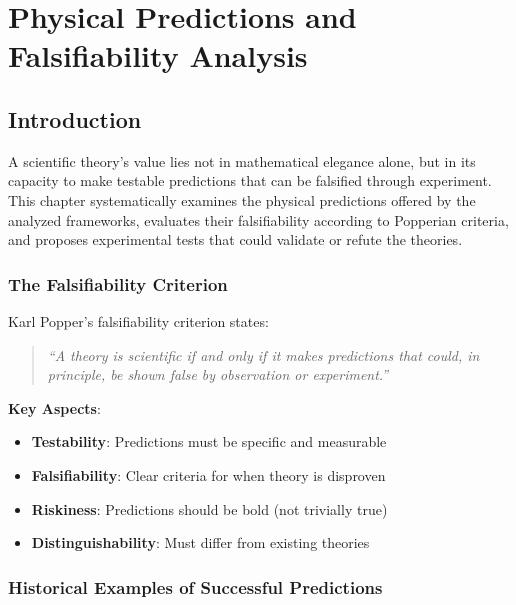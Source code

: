 
\chapter{Physical Predictions and Falsifiability Analysis}
\label{ch:predictions}

\section{Introduction}

A scientific theory's value lies not in mathematical elegance alone, but in its capacity to make testable predictions that can be falsified through experiment. This chapter systematically examines the physical predictions offered by the analyzed frameworks, evaluates their falsifiability according to Popperian criteria, and proposes experimental tests that could validate or refute the theories.

\subsection{The Falsifiability Criterion}

Karl Popper's falsifiability criterion states:

\begin{quote}
\textit{``A theory is scientific if and only if it makes predictions that could, in principle, be shown false by observation or experiment.''}
\end{quote}

\textbf{Key Aspects}:
\begin{itemize}
    \item \textbf{Testability}: Predictions must be specific and measurable
    \item \textbf{Falsifiability}: Clear criteria for when theory is disproven
    \item \textbf{Riskiness}: Predictions should be bold (not trivially true)
    \item \textbf{Distinguishability}: Must differ from existing theories
\end{itemize}

\subsection{Historical Examples of Successful Predictions}

